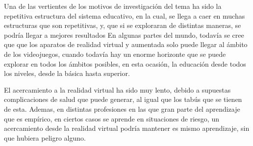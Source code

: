 Una de las vertientes de los motivos de investigación del tema ha sido la repetitiva estructura del sistema educativo, en la cual, se llega a caer en muchas estructuras que son repetitivas, y, que si se exploraran de distintas maneras, se podría llegar a mejores resultados
En algunas partes del mundo, todavía se cree que que los aparatos de realidad virtual y aumentada solo puede llegar al ámbito de los videojuegos, cuando todavía hay un enorme horizonte que se puede explorar en todos los ámbitos posibles, en esta ocasión, la educación desde todos los niveles, desde la básica hasta superior.

El acercamiento a la realidad virtual ha sido muy lento, debido a supuestas complicaciones de salud que puede generar, al igual que los tabús que se tienen de esta. Ademas, en distintas profesiones en las que gran parte del aprendizaje que es empírico, en ciertos casos se aprende en situaciones de riesgo, un acercamiento desde la realidad virtual podría mantener es mismo aprendizaje, sin que hubiera peligro alguno.
